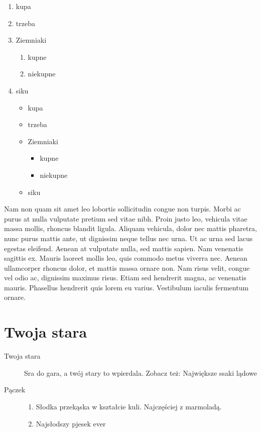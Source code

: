 \documentclass[a4paper,10pt]{book}
\begin{document}
\begin{enumerate}
	\item kupa
	\item trzeba
	\item Ziemniaki
	\begin{enumerate}
		\item kupne
		\item niekupne
	\end{enumerate}
	\item siku
	\begin{itemize}
	\item kupa
	\item trzeba
	\item Ziemniaki
	\begin{itemize}
		\item kupne
		\item niekupne
	\end{itemize}
	\item siku
\end{itemize}
\end{enumerate}
\bigskip

Nam non quam sit amet leo lobortis sollicitudin congue non turpis. Morbi ac purus at nulla vulputate pretium sed vitae nibh. Proin justo leo, vehicula vitae massa mollis, rhoncus blandit ligula. Aliquam vehicula, dolor nec mattis pharetra, nunc purus mattis ante, ut dignissim neque tellus nec urna. Ut ac urna sed lacus egestas eleifend. Aenean at vulputate nulla, sed mattis sapien. Nam venenatis sagittis ex. Mauris laoreet mollis leo, quis commodo metus viverra nec. Aenean ullamcorper rhoncus dolor, et mattis massa ornare non. Nam risus velit, congue vel odio ac, dignissim maximus risus. Etiam sed hendrerit magna, ac venenatis mauris. Phasellus hendrerit quis lorem eu varius. Vestibulum iaculis fermentum ornare. 
\pagebreak

\section{Twoja stara}

\begin{description}
	\item [Twoja stara] Sra do gara, a twój stary to wpierdala. Zobacz też: Największe ssaki lądowe
	\item [Pączek] 
	\begin{enumerate}
		\item Słodka przekąska w kształcie kuli. Najczęściej z marmoladą. 
		\item Najsłodszy pjesek ever
	\end{enumerate}
	
\end{description}
\end{document}
